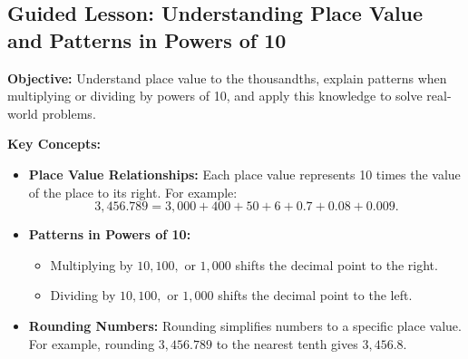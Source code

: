 \documentclass[12pt]{article}
\title{}
\date{}
\begin{document}
\subsection*{Guided Lesson: Understanding Place Value and Patterns in Powers of 10}
\onehalfspacing

\begin{tcolorbox}[colframe=black!40, colback=gray!5, 
coltitle=black, colbacktitle=black!20, fonttitle=\bfseries\Large, 
title=Learning Objective, halign title=center, left=5pt, right=5pt, top=5pt, bottom=15pt]
\textbf{Objective:} Understand place value to the thousandths, explain patterns when multiplying or dividing by powers of 10, and apply this knowledge to solve real-world problems.
\end{tcolorbox}

\vspace{1em}

\begin{tcolorbox}[colframe=black!60, colback=white, 
coltitle=black, colbacktitle=black!15, fonttitle=\bfseries\Large, 
title=Key Concepts and Vocabulary, halign title=center, left=10pt, right=10pt, top=10pt, bottom=15pt]
\textbf{Key Concepts:}
\begin{itemize}
    \item \textbf{Place Value Relationships:} Each place value represents 10 times the value of the place to its right. For example:
    \[
    3,456.789 = 3,000 + 400 + 50 + 6 + 0.7 + 0.08 + 0.009.
    \]
    \item \textbf{Patterns in Powers of 10:}
    \begin{itemize}
        \item Multiplying by \( 10, 100, \) or \( 1,000 \) shifts the decimal point to the right.
        \item Dividing by \( 10, 100, \) or \( 1,000 \) shifts the decimal point to the left.
    \end{itemize}
    \item \textbf{Rounding Numbers:} Rounding simplifies numbers to a specific place value. For example, rounding \( 3,456.789 \) to the nearest tenth gives \( 3,456.8 \).
\end{itemize}
\end{tcolorbox}

\vspace{1em}
\end{document}
